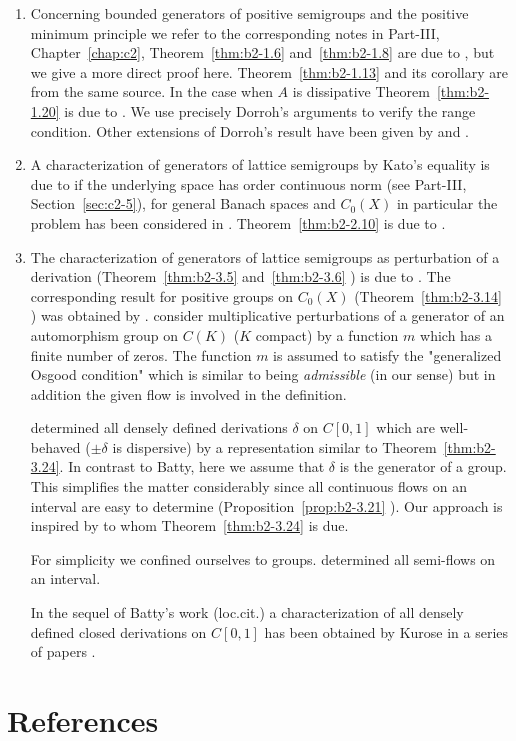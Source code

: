 \begin{enumerate}[label=\emph{Section \arabic*:}, wide]

\item
Concerning bounded generators of positive semigroups and the positive minimum principle we refer to the corresponding notes in Part-III, Chapter~\ref{chap:c2},  Theorem~\ref{thm:b2-1.6} and~\ref{thm:b2-1.8} are due to \textcite{arendtchernoffkato:1982}, but we give a more direct proof here.
Theorem~\ref{thm:b2-1.13} and its corollary are from the same source.
In the case when $A$ is dissipative Theorem~\ref{thm:b2-1.20} is due to \textcite{dorroh:1966}.
We use precisely Dorroh's arguments to verify the range condition.
Other extensions of Dorroh's result have been given by \textcite{lumer:1974} and \textcite{lumer:1975}.

\item 
A characterization of generators of lattice semigroups by Kato's equality is due to  \textcite{nageluhlig:1981} if the underlying space has order continuous norm (see Part-III, Section~\ref{sec:c2-5}), for general Banach spaces and $C_{0}(X)$ in particular the problem has been considered in \textcite{arendt:1982}.
Theorem~\ref{thm:b2-2.10} is due to \textcite{uhlig:1979}.

\item
The characterization of generators of lattice semigroups as perturbation of a derivation (Theorem~\ref{thm:b2-3.5} and~\ref{thm:b2-3.6} ) is due to \textcite{derndingernagel:1979}.
The corresponding result for positive groups on $C_{0}(X)$ (Theorem~\ref{thm:b2-3.14} ) was obtained by \textcite{arendtgreiner:1984}.
\textcite{linetal:1977} consider multiplicative perturbations of a generator of an automorphism group on $C(K)$ ($K$ compact) by a function $m$ which has a finite number of zeros.
The function $m$ is assumed to satisfy the "generalized Osgood condition" which is similar to being \emph{admissible} (in our sense) but in addition the given flow is involved in the definition.

\textcite{batty:1981} determined all densely defined derivations $\delta$ on $C[0,1]$ which are well-behaved (\ie  $\pm\delta$ is dispersive) by a representation similar to Theorem~\ref{thm:b2-3.24}.
In contrast to Batty, here we assume that $\delta$ is the generator of a group.
This simplifies the matter considerably since all continuous flows on an interval are easy to determine (Proposition~\ref{prop:b2-3.21} ).
Our approach is inspired by \textcite{delaubenfels:1984} to whom Theorem~\ref{thm:b2-3.24} is due.

For simplicity we confined ourselves to groups.
\textcite{uhlig:1979} determined all semi-flows on an interval.

In the sequel of Batty's work (loc.cit.) a characterization of all densely defined closed derivations on $C[0,1]$ has been obtained by Kurose in a series of papers 
\textcite{kurose:1981, kurose:1982, kurose:1983}.
\end{enumerate}
\section*{References}
{\RaggedRight
  \printbibliography[heading=none]
 }
